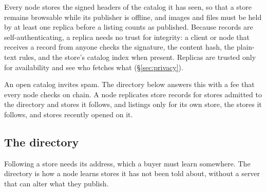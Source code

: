 Every node stores the signed headers of the catalog it has seen, so that a store remains browsable while its publisher is offline, and images and files must be held by at least one replica before a listing counts as published. Because records are self-authenticating, a replica needs no trust for integrity: a client or node that receives a record from anyone checks the signature, the content hash, the plain-text rules, and the store's catalog index when present. Replicas are trusted only for availability and see who fetches what (\S\ref{sec:privacy}).

An open catalog invites spam. The directory below answers this with a fee that every node checks on chain. A node replicates store records for stores admitted to the directory and stores it follows, and listings only for its own store, the stores it follows, and stores recently opened on it.

\subsection{The directory}
\label{sec:directory}

Following a store needs its address, which a buyer must learn somewhere. The directory is how a node learns stores it has not been told about, without a server that can alter what they publish.

